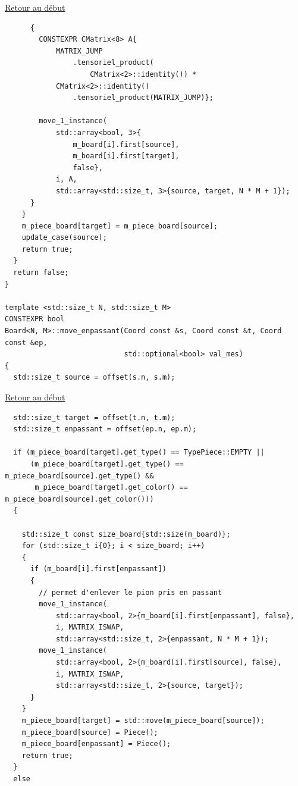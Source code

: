 {\begin{frame}[fragile]
\hyperlink{conclusion}{Retour au début}\newline
\begin{verbatim}
      {
        CONSTEXPR CMatrix<8> A{
            MATRIX_JUMP
                .tensoriel_product(
                    CMatrix<2>::identity()) *
            CMatrix<2>::identity()
                .tensoriel_product(MATRIX_JUMP)};

        move_1_instance(
            std::array<bool, 3>{
                m_board[i].first[source],
                m_board[i].first[target],
                false},
            i, A,
            std::array<std::size_t, 3>{source, target, N * M + 1});
      }
    }
    m_piece_board[target] = m_piece_board[source];
    update_case(source);
    return true;
  }
  return false;
}

template <std::size_t N, std::size_t M>
CONSTEXPR bool
Board<N, M>::move_enpassant(Coord const &s, Coord const &t, Coord const &ep,
                            std::optional<bool> val_mes)
{
  std::size_t source = offset(s.n, s.m);
\end{verbatim}
\end{frame}

\begin{frame}[fragile]
\hyperlink{conclusion}{Retour au début}\newline
\begin{verbatim}
  std::size_t target = offset(t.n, t.m);
  std::size_t enpassant = offset(ep.n, ep.m);

  if (m_piece_board[target].get_type() == TypePiece::EMPTY ||
      (m_piece_board[target].get_type() == m_piece_board[source].get_type() &&
       m_piece_board[target].get_color() == m_piece_board[source].get_color()))
  {

    std::size_t const size_board{std::size(m_board)};
    for (std::size_t i{0}; i < size_board; i++)
    {
      if (m_board[i].first[enpassant])
      {
        // permet d'enlever le pion pris en passant
        move_1_instance(
            std::array<bool, 2>{m_board[i].first[enpassant], false},
            i, MATRIX_ISWAP,
            std::array<std::size_t, 2>{enpassant, N * M + 1});
        move_1_instance(
            std::array<bool, 2>{m_board[i].first[source], false},
            i, MATRIX_ISWAP,
            std::array<std::size_t, 2>{source, target});
      }
    }
    m_piece_board[target] = std::move(m_piece_board[source]);
    m_piece_board[source] = Piece();
    m_piece_board[enpassant] = Piece();
    return true;
  }
  else
\end{verbatim}
\end{frame}

}
